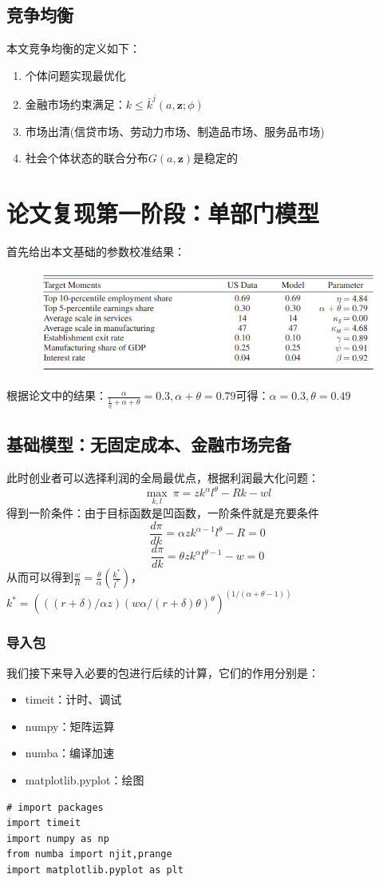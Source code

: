 \documentclass[a4paper, 12pt]{ctexart}
\begin{document}
\subsection{竞争均衡}
本文竞争均衡的定义如下：
\begin{enumerate}
    \item 个体问题实现最优化
    \item 金融市场约束满足：$k \leq \bar{k}^j(a,\mathbf{z};\phi)$
    \item 市场出清(信贷市场、劳动力市场、制造品市场、服务品市场)
    \item 社会个体状态的联合分布$G(a,\mathbf{z})$是稳定的
\end{enumerate}

\section{论文复现第一阶段：单部门模型}
首先给出本文基础的参数校准结果：
\begin{figure}[h]
    \centering
    \includegraphics[width=0.8\linewidth]{pic/cali.png}
    \nonumber
    \label{fig:enter-label}
\end{figure}
根据论文中的结果：$\frac{\alpha}{\frac{1}{\eta}+\alpha+\theta}=0.3,\alpha+\theta=0.79$可得：$\alpha=0.3,\theta=0.49$
\subsection{基础模型：无固定成本、金融市场完备}
此时创业者可以选择利润的全局最优点，根据利润最大化问题：
$$\max_{k,l} \ \pi= z k^{\alpha} l^{\theta} - Rk - wl$$
得到一阶条件：由于目标函数是凹函数，一阶条件就是充要条件
$$\frac{d\pi}{dk}=\alpha z k^{\alpha-1} l^{\theta}-R=0$$
$$\frac{d\pi}{dk}=\theta z k^{\alpha} l^{\theta-1}-w=0$$
从而可以得到$\frac{w}{R}=\frac{\theta}{\alpha}(\frac{k^*}{l^*})$，$k^*=\left(((r+\delta)/\alpha z)(w\alpha/(r+\delta)\theta)^\theta\right)^{(1/(\alpha+\theta-1))}$
\subsubsection{导入包}
我们接下来导入必要的包进行后续的计算，它们的作用分别是：
\begin{itemize}
    \item timeit：计时、调试
    \item numpy：矩阵运算
    \item numba：编译加速
    \item matplotlib.pyplot：绘图
\end{itemize}
\begin{lstlisting}
# import packages
import timeit
import numpy as np
from numba import njit,prange
import matplotlib.pyplot as plt
\end{lstlisting}
\end{document}
